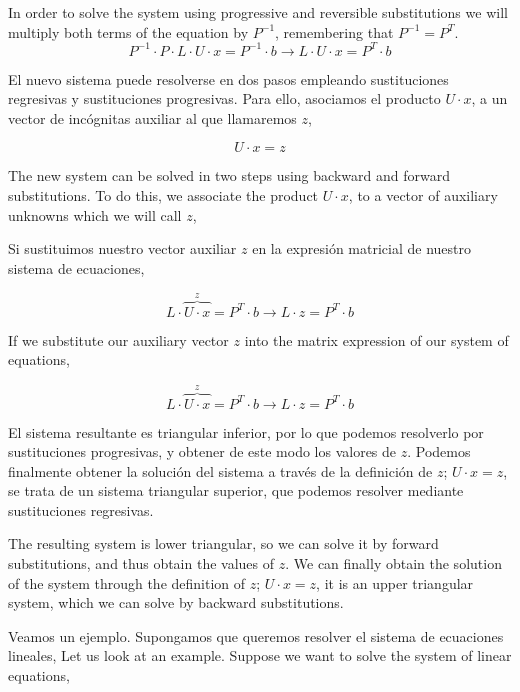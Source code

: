 \begin{paracol}{2}
\switchcolumn
In order to solve the system using progressive and reversible substitutions we will multiply both terms of the equation by $P^{-1}$, remembering that $P^{-1}=P^T$.
\begin{equation*}
P^{-1} \cdot P\cdot L \cdot U \cdot x=P^{-1}\cdot b \rightarrow L\cdot U \cdot x= P^T\cdot b
\end{equation*}

\switchcolumn
El nuevo sistema puede resolverse en dos pasos empleando sustituciones regresivas y sustituciones progresivas. Para ello, asociamos el producto $U\cdot x$, a un vector de incógnitas auxiliar al que llamaremos $z$,

\begin{equation*}
U\cdot x=z
\end{equation*}

\switchcolumn
The new system can be solved in two steps using backward and forward substitutions. To do this, we associate the product $U \cdot x$, to a vector of auxiliary unknowns which we will call $z$,

\switchcolumn
Si sustituimos nuestro vector auxiliar $z$ en la expresión matricial de nuestro sistema de ecuaciones,

\begin{equation*}
L\cdot \overbrace{U\cdot x}^z=P^T\cdot b \rightarrow L\cdot z=P^T\cdot b
\end{equation*}

\switchcolumn
If we substitute our auxiliary vector $z$ into the matrix expression of our system of equations,

\begin{equation*}
L\cdot \overbrace{U\cdot x}^z=P^T\cdot b \rightarrow L\cdot z=P^T\cdot b
\end{equation*}

\switchcolumn
El sistema resultante es triangular inferior, por lo que podemos resolverlo por sustituciones progresivas, y obtener de este modo los valores de $z$. Podemos finalmente obtener la solución del sistema a través de la definición de $z$; $U\cdot x =z$, se trata de un sistema triangular superior, que podemos resolver mediante sustituciones regresivas.

\switchcolumn
The resulting system is lower triangular, so we can solve it by forward substitutions, and thus obtain the values of $z$. We can finally obtain the solution of the system through the definition of $z$; $U \cdot x =z$, it is an upper triangular system, which we can solve by backward substitutions.

\switchcolumn
Veamos un ejemplo. Supongamos que queremos resolver el sistema de ecuaciones lineales,
\switchcolumn
Let us look at an example. Suppose we want to solve the system of linear equations,
\end{paracol}


